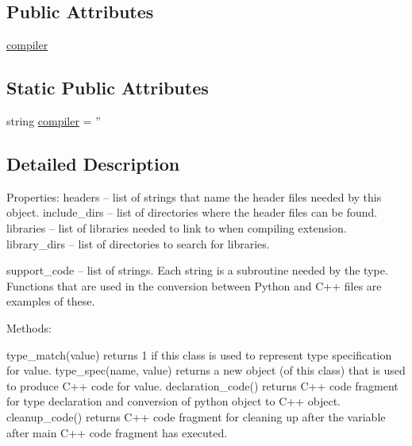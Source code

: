 \subsection*{Public Attributes}
\begin{DoxyCompactItemize}
\item 
\hyperlink{classscipy_1_1weave_1_1base__spec_1_1base__converter_ac3e39191fffe91b942d5afe4a64c3f36}{compiler}
\end{DoxyCompactItemize}
\subsection*{Static Public Attributes}
\begin{DoxyCompactItemize}
\item 
string \hyperlink{classscipy_1_1weave_1_1base__spec_1_1base__converter_a946779218f3fbeee9bb1c0fd41c7b388}{compiler} = ''
\end{DoxyCompactItemize}


\subsection{Detailed Description}
\begin{DoxyVerb}    Properties:
    headers --  list of strings that name the header files needed by this
                object.
    include_dirs -- list of directories where the header files can be found.
    libraries   -- list of libraries needed to link to when compiling
                   extension.
    library_dirs -- list of directories to search for libraries.

    support_code -- list of strings.  Each string is a subroutine needed
                    by the type.  Functions that are used in the conversion
                    between Python and C++ files are examples of these.

    Methods:

    type_match(value) returns 1 if this class is used to represent type
                      specification for value.
    type_spec(name, value)  returns a new object (of this class) that is
                            used to produce C++ code for value.
    declaration_code()    returns C++ code fragment for type declaration and
                          conversion of python object to C++ object.
    cleanup_code()    returns C++ code fragment for cleaning up after the
                      variable after main C++ code fragment has executed.\end{DoxyVerb}
 


